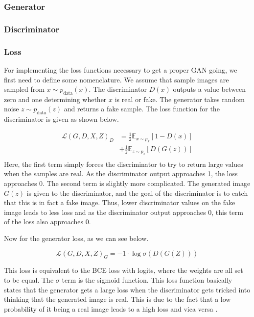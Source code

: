 \documentclass[12pt, fleqn, titlepage]{article}
\begin{document}
\subsubsection{Generator}


\subsubsection{Discriminator}


\subsubsection{Loss}
For implementing the loss functions necessary to get a proper GAN going, we first need to define some nomenclature. We assume that sample images are sampled from $x \sim p_{\text {data}}(x)$. The discriminator $D(x)$ outputs a value between zero and one determining whether $x$ is real or fake. The generator takes random noise $z \sim p_{\text {data}}(z)$ and returns a fake sample. The loss function for the discriminator is given as shown below.

\[\begin{aligned}
	\mathcal{L}\left(G, D, X, Z\right)_D &=\frac{1}{2} \mathbb{E}_{x \sim p_{x}}[1-D(x)] \\
	&+\frac{1}{2} \mathbb{E}_{z \sim p_{z}}[D(G(z))] \\
\end{aligned}\]
Here, the first term simply forces the discriminator to try to return large values when the samples are real. As the discriminator output approaches 1, the loss approaches 0. The second term is slightly more complicated. The generated image $G(z)$ is given to the discriminator, and the goal of the discriminator is to catch that this is in fact a fake image. Thus, lower discriminator values on the fake image leads to less loss and as the discriminator output approaches 0, this term of the loss also approaches 0.

Now for the generator loss, as we can see below.

\[\mathcal{L}\left(G, D, X, Z\right)_G=-1 \cdot \log \sigma\left(D(G(Z))\right)\]

This loss is equivalent to the BCE loss with logits, where the weights are all set to be equal. The $\sigma$ term is the sigmoid function. This loss function basically states that the generator gets a large loss when the discriminator gets tricked into thinking that the generated image is real. This is due to the fact that a low probability of it being a real image leads to a high loss and vica versa \cite{bcewithlogits}.
\end{document}

